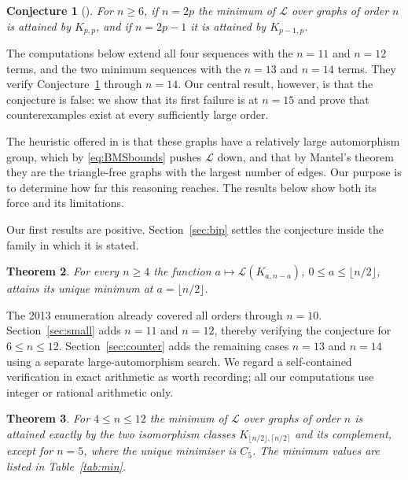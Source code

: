 \documentclass[11pt]{article}
\newtheorem{theorem}{Theorem}
\newtheorem{conjecture}[theorem]{Conjecture}
\theoremstyle{definition}
\newcommand{\Lk}{\mathcal{L}}
\newcommand{\Kbal}{K_{\lfloor n/2\rfloor,\lceil n/2\rceil}}
\begin{document}
\begin{conjecture}[\cite{DMS18}]\label{conj:DMS}
For $n\ge6$, if $n=2p$ the minimum of $\Lk$ over graphs of order $n$ is attained by $K_{p,p}$, and if $n=2p-1$ it is attained by $K_{p-1,p}$.
\end{conjecture}

The computations below extend all four sequences with the $n=11$ and $n=12$
terms, and the two minimum sequences with the $n=13$ and $n=14$ terms. They
verify Conjecture~\ref{conj:DMS} through $n=14$. Our central result, however,
is that the conjecture is false: we show that its first failure is at $n=15$
and prove that counterexamples exist at every sufficiently large order.

The heuristic offered in \cite{DMS18} is that these graphs have a relatively large automorphism group, which by \eqref{eq:BMSbounds} pushes $\Lk$ down, and that by Mantel's theorem they are the triangle-free graphs with the largest number of edges. Our purpose is to determine how far this reasoning reaches. The results below show both its force and its limitations.

Our first results are positive. Section~\ref{sec:bip} settles the conjecture inside the family in which it is stated.

\begin{theorem}\label{thm:bip}
For every $n\ge 4$ the function $a\mapsto \Lk(K_{a,n-a})$, $0\le a\le \lfloor n/2\rfloor$, attains its unique minimum at $a=\lfloor n/2\rfloor$.
\end{theorem}

The 2013 enumeration already covered all orders through $n=10$.
Section~\ref{sec:small} adds $n=11$ and $n=12$, thereby verifying the
conjecture for $6\le n\le 12$.  Section~\ref{sec:counter} adds the remaining
cases $n=13$ and $n=14$ using a separate large-automorphism search.  We regard
a self-contained verification in exact
arithmetic as worth recording; all our computations use integer or rational
arithmetic only.

\begin{theorem}\label{thm:small}
For $4\le n\le 12$ the minimum of $\Lk$ over graphs of order $n$ is attained exactly by the two isomorphism classes $\Kbal$ and its complement, except for $n=5$, where the unique minimiser is $C_5$. The minimum values are listed in Table~\ref{tab:min}.
\end{theorem}
\end{document}
